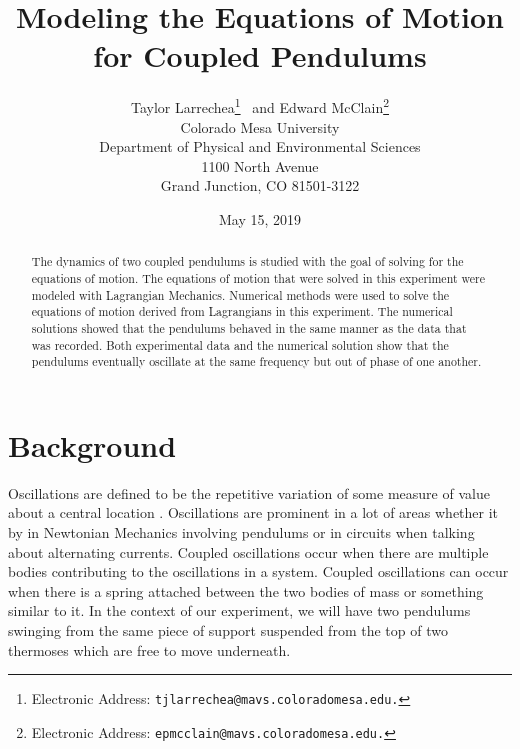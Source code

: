 \documentclass[twocolumn]{article}
\title{\textbf{Modeling the Equations of Motion for Coupled Pendulums}}
\author{Taylor Larrechea\footnote{Electronic Address: \texttt{tjlarrechea@mavs.coloradomesa.edu.}} \ and Edward McClain\footnote{Electronic Address: \texttt{epmcclain@mavs.coloradomesa.edu.}} \\
    Colorado Mesa University \\
    Department of Physical and Environmental Sciences \\
    1100 North Avenue \\
    Grand Junction, CO 81501-3122}
\date{May 15, 2019}
\begin{document}
\maketitle
\begin{abstract}
The dynamics of two coupled pendulums is studied with the goal of solving for the equations of motion. The equations of motion that were solved in this experiment were modeled with Lagrangian Mechanics. Numerical methods were used to solve the equations of motion derived from Lagrangians in this experiment. The numerical solutions showed that the pendulums behaved in the same manner as the data that was recorded. Both experimental data and the numerical solution show that the pendulums eventually oscillate at the same frequency but out of phase of one another.
\end{abstract}
\section*{Background}
Oscillations are defined to be the repetitive variation of some measure of value about a central location \cite{WikiOsc}. Oscillations are prominent in a lot of areas whether it by in Newtonian Mechanics involving pendulums or in circuits when talking about alternating currents. Coupled oscillations occur when there are multiple bodies contributing to the oscillations in a system. Coupled oscillations can occur when there is a spring attached between the two bodies of mass or something similar to it. In the context of our experiment, we will have two pendulums swinging from the same piece of support suspended from the top of two thermoses which are free to move underneath. 
\end{document}
